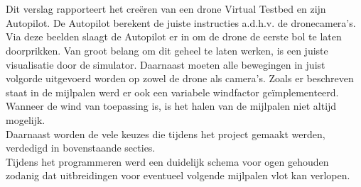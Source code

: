 \\
\\
Dit verslag rapporteert het cre\"eren van een drone Virtual Testbed en zijn Autopilot. De Autopilot berekent de juiste instructies a.d.h.v. de dronecamera's. Via deze beelden slaagt de Autopilot er in om de drone de eerste bol te laten doorprikken. Van groot belang om dit geheel te laten werken, is een juiste visualisatie door de simulator. Daarnaast moeten alle bewegingen in juist volgorde uitgevoerd worden op zowel de drone als camera's. Zoals er beschreven staat in de mijlpalen werd er ook een variabele windfactor ge\"implementeerd. Wanneer de wind van toepassing is, is het halen van de mijlpalen niet altijd mogelijk. 
\\ 
Daarnaast worden de vele keuzes die tijdens het project gemaakt werden, verdedigd in bovenstaande secties.
\\
Tijdens het programmeren werd een duidelijk schema voor ogen gehouden zodanig dat uitbreidingen voor eventueel volgende mijlpalen vlot kan verlopen.\\